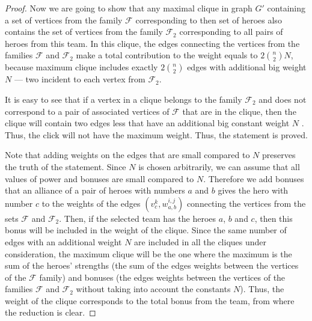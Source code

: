 \documentclass{article}
\begin{document}
\begin{proof}
    Now we are going to show that any maximal clique in graph $G'$ containing a set of vertices from the family $\mathcal{F}$ corresponding to then set of heroes also contains the set of vertices from the family $\mathcal {F}_2$ corresponding to all pairs of heroes from this team. In this clique, the edges connecting the vertices from the families $\mathcal{F}$ and $ \mathcal {F}_2$ make a total contribution to the weight equals to $2 \binom{n}{2} N$, because maximum clique includes exactly $2 \binom {n} {2}$ edges with additional big weight $N$ --- two incident to each vertex from $\mathcal {F}_2$.
    
    	It is easy to see that if a vertex in a clique belongs to the family $\mathcal{F}_2 $ and does not correspond to a pair of associated vertices of $ \mathcal {F} $ that are in the clique, then the clique will contain two edges less that have an additional big constant weight $N$ . Thus, the click will not have the maximum weight. Thus, the statement is proved.
    	
    	 Note that adding weights on the edges that are small compared to $ N $ preserves the truth of the statement. Since $ N $ is chosen arbitrarily, we can assume that all values of power and bonuses are small compared to $ N $. Therefore we add bonuses that an alliance of a pair of heroes with numbers $ a $ and $ b $ gives the hero with number $ c $ to the weights of the edges  $ (v_c^{k}, w_{a, b}^{i, j}) $ connecting the vertices from the sets $\mathcal {F}$ and $\mathcal {F}_2$. Then, if the selected team has the heroes $a$, $b$ and $c$, then this bonus will be included in the weight of the clique. Since the same number of edges with an additional weight $ N$ are included in all the cliques under consideration, the maximum clique will be the one where the maximum is the sum of the heroes' strengths (the sum of the edges weights between the vertices of the $\mathcal {F} $ family) and bonuses (the edges weights between the vertices of the families $\mathcal{F}$ and $\mathcal {F}_2$ without taking into account the constants $N$). Thus, the weight of the clique corresponds to the total bonus from the team, from where the reduction is clear.
    
\end{proof}

\end{document}
